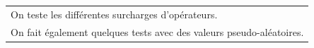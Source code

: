 \documentclass[a4paper,12pt]{article}
\begin{document}
\begin{tabularx}{\textwidth}{|X|}
    On teste les différentes surcharges d’opérateurs.                                                                                                                                                                                                                                                                            \\
    On fait également quelques tests avec des valeurs pseudo-aléatoires.                                                                                                                                                                                                                                                         \\
    \hline
\end{tabularx}

\vspace{1cm}
\end{document}
